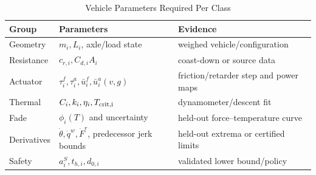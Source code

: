 \begin{table}[t]
\caption{Vehicle Parameters Required Per Class}
\label{tab:parameters}
\centering
\scriptsize
\begin{tabular}{@{}p{}p{}p{}@{}}
\toprule
Group & Parameters & Evidence \\
\midrule
Geometry & $m_i,L_i$, axle/load state & weighed vehicle/configuration \\
Resistance & $c_{r,i},C_{d,i}A_i$ & coast-down or source data \\
Actuator & $\tau_i^f,\tau_i^a,\bar u_i^f,\bar u_i^a(v,g)$ & friction/retarder step and power maps \\
Thermal & $C_i,k_i,\eta_i,T_{\rm crit,i}$ & dynamometer/descent fit \\
Fade & $\phi_i(T)$ and uncertainty & held-out force--temperature curve \\
Derivatives & $\dot\theta,\dot q^w,\dot F^r$, predecessor jerk bounds & held-out extrema or certified limits \\
Safety & $a_i^S,t_{h,i},d_{0,i}$ & validated lower bound/policy \\
\bottomrule
\end{tabular}
\end{table}
